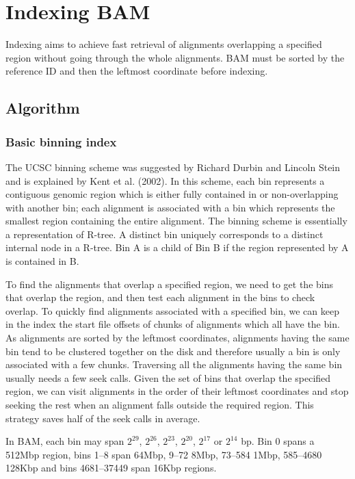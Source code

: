 \documentclass[10pt]{article}
\begin{document}
\pagebreak

\section{Indexing BAM}
Indexing aims to achieve fast retrieval of alignments overlapping a
specified region without going through the whole alignments. BAM must be
sorted by the reference ID and then the leftmost coordinate before
indexing.

\subsection{Algorithm}
\subsubsection{Basic binning index}
The UCSC binning scheme was suggested by Richard Durbin and Lincoln
Stein and is explained by Kent et al. (2002). In this scheme, each bin
represents a contiguous genomic region which is either fully contained
in or non-overlapping with another bin; each alignment is associated
with a bin which represents the smallest region containing the entire
alignment. The binning scheme is essentially a representation of
R-tree. A distinct bin uniquely corresponds to a distinct internal node
in a R-tree. Bin A is a child of Bin B if the region represented by A is
contained in B.

To find the alignments that overlap a specified region, we need to get
the bins that overlap the region, and then test each alignment in the
bins to check overlap. To quickly find alignments associated with a
specified bin, we can keep in the index the start file offsets of chunks
of alignments which all have the bin. As alignments are sorted by the
leftmost coordinates, alignments having the same bin tend to be
clustered together on the disk and therefore usually a bin is only
associated with a few chunks. Traversing all the alignments having the
same bin usually needs a few seek calls. Given the set of bins that
overlap the specified region, we can visit alignments in the order of
their leftmost coordinates and stop seeking the rest when an alignment
falls outside the required region. This strategy saves half of the seek
calls in average.

In BAM, each bin may span $2^{29}$, $2^{26}$, $2^{23}$, $2^{20}$,
$2^{17}$ or $2^{14}$ bp. Bin 0 spans a 512Mbp region, bins 1--8 span
64Mbp, 9--72 8Mbp, 73--584 1Mbp, 585--4680 128Kbp and bins 4681--37449
span 16Kbp regions.
\end{document}
